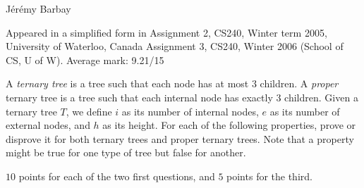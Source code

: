 \begin{authorship}J{\'e}r{\'e}my Barbay\end{authorship}
\begin{usage}
Appeared in a simplified form in
Assignment 2, CS240, Winter term 2005, University of Waterloo, Canada
Assignment 3, CS240, Winter 2006 (School of CS, U of W). Average mark: 9.21/15
\end{usage}

A {\em ternary tree} is a tree such that each node has at most $3$ children.
A {\em proper} ternary tree is a tree such that each internal node has exactly $3$ children.
%
Given a ternary tree $T$, we define
  $i$ as its number of internal nodes,
  $e$ as its number of external nodes, and
  $h$ as its height.
%
For each of the following properties, prove or disprove it for both ternary
trees and proper ternary trees. Note that a property might be true for one type of tree but false for another.

\begin{INUTILE}
 \begin{markingScheme}
  $10$ points for each of the two first questions, and $5$ points for
  the third.
\end{markingScheme}
\end{INUTILE}

